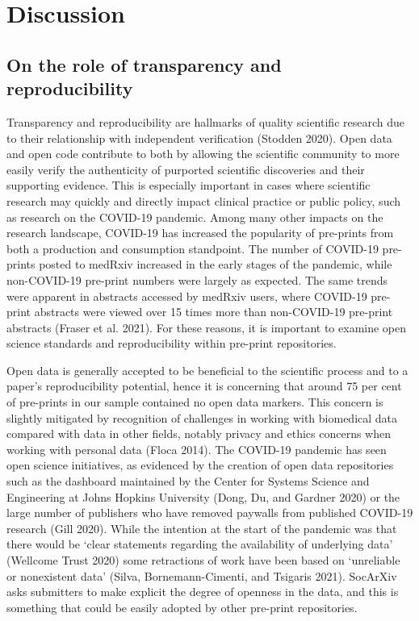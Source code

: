 \documentclass[
]{article}
\begin{document}
\hypertarget{discussion}{%
\section{Discussion}\label{discussion}}

\hypertarget{on-the-role-of-transparency-and-reproducibility}{%
\subsection{On the role of transparency and reproducibility}\label{on-the-role-of-transparency-and-reproducibility}}

Transparency and reproducibility are hallmarks of quality scientific research due to their relationship with independent verification (Stodden 2020). Open data and open code contribute to both by allowing the scientific community to more easily verify the authenticity of purported scientific discoveries and their supporting evidence. This is especially important in cases where scientific research may quickly and directly impact clinical practice or public policy, such as research on the COVID-19 pandemic. Among many other impacts on the research landscape, COVID-19 has increased the popularity of pre-prints from both a production and consumption standpoint. The number of COVID-19 pre-prints posted to medRxiv increased in the early stages of the pandemic, while non-COVID-19 pre-print numbers were largely as expected. The same trends were apparent in abstracts accessed by medRxiv users, where COVID-19 pre-print abstracts were viewed over 15 times more than non-COVID-19 pre-print abstracts (Fraser et al. 2021). For these reasons, it is important to examine open science standards and reproducibility within pre-print repositories.

Open data is generally accepted to be beneficial to the scientific process and to a paper's reproducibility potential, hence it is concerning that around 75 per cent of pre-prints in our sample contained no open data markers. This concern is slightly mitigated by recognition of challenges in working with biomedical data compared with data in other fields, notably privacy and ethics concerns when working with personal data (Floca 2014). The COVID-19 pandemic has seen open science initiatives, as evidenced by the creation of open data repositories such as the dashboard maintained by the Center for Systems Science and Engineering at Johns Hopkins University (Dong, Du, and Gardner 2020) or the large number of publishers who have removed paywalls from published COVID-19 research (Gill 2020). While the intention at the start of the pandemic was that there would be `clear statements regarding the availability of underlying data' (Wellcome Trust 2020) some retractions of work have been based on `unreliable or nonexistent data' (Silva, Bornemann-Cimenti, and Tsigaris 2021). SocArXiv asks submitters to make explicit the degree of openness in the data, and this is something that could be easily adopted by other pre-print repositories.
\end{document}
